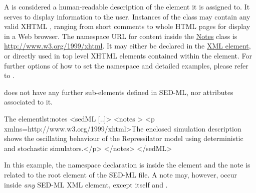 \label{class:notes}

A  is considered a  human-readable description of the element it is assigned to. It serves to display information to the user. 
Instances of the  class may contain any valid XHTML \citep{P+02}, ranging from short comments to whole HTML pages for display in a Web browser. 
The namespace URL for  content inside the \hyperref[class:notes]{Notes} class is \url{http://www.w3.org/1999/xhtml}. It may either be declared in the \hyperref[class:sed-ml]{ XML element}, or directly used in top level XHTML elements contained within the   element. For further options of how to set the namespace and detailed examples, please refer to \citep[p. 14]{HBH+10}.

  does not have any further sub-elements defined in SED-ML, nor attributes associated to it.
%

%
\begin{myXmlLst}{The  element}{lst:notes}
<sedML [..]>
 <notes >
  <p xmlns=http://www.w3.org/1999/xhtml>The enclosed simulation description shows the oscillating behaviour of 
     the Repressilator model using deterministic and stochastic simulators.</p>
 </notes>
</sedML>
\end{myXmlLst}
%
In this example, the namespace declaration is inside the  element and the note is related to the  root element of the SED-ML file. A note may, however, occur inside \emph{any} SED-ML XML element, except  itself and \hyperref[class:annotation]{}.


